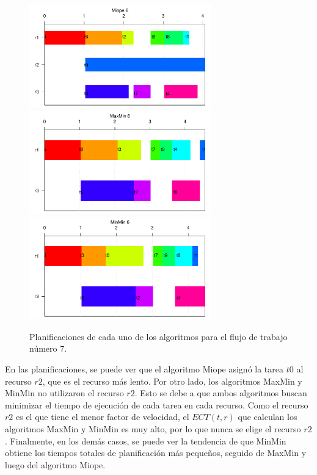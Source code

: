 \begin{figure}
\begin{center}
  \includegraphics[width=0.7\textwidth]{imagenes/Myopic6.pdf}
  \includegraphics[width=0.7\textwidth]{imagenes/MaxMin6.pdf}
  \includegraphics[width=0.7\textwidth]{imagenes/MinMin6.pdf}
\end{center}
\label{fig:schedules6}
\caption{Planificaciones de cada uno de los algoritmos para el flujo de trabajo número 7.}
\end{figure}

En las planificaciones, se puede ver que el algoritmo Miope asignó la tarea $t0$ al recurso $r2$, que es el recurso más lento. Por otro lado, los algoritmos MaxMin y MinMin no utilizaron el recurso $r2$. Esto se debe a que ambos algoritmos buscan minimizar el tiempo de ejecución de cada tarea en cada recurso. Como el recurso $r2$ es el que tiene el menor factor de velocidad, el $ECT(t,r)$ que calculan los algoritmos MaxMin y MinMin es muy alto, por lo que nunca se elige el recurso $r2$. Finalmente, en los demás casos, se puede ver la tendencia de que MinMin obtiene los tiempos totales de planificación más pequeños, seguido de MaxMin y luego del algoritmo Miope. 

